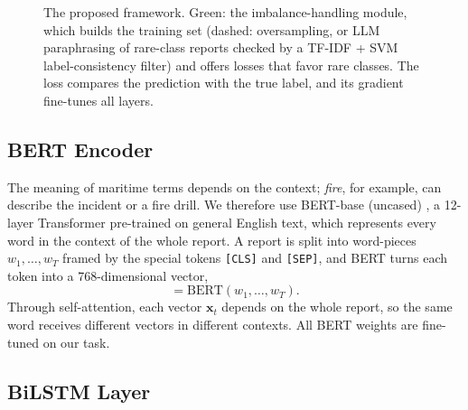 \documentclass[conference]{IEEEtran}
\begin{document}
\begin{figure}[t]
\caption{The proposed framework. Green: the imbalance-handling module, which builds the training set (dashed: oversampling, or LLM paraphrasing of rare-class reports checked by a TF-IDF + SVM label-consistency filter) and offers losses that favor rare classes. The loss compares the prediction with the true label, and its gradient fine-tunes all layers.}
\label{fig:framework}
\end{figure}

\subsection{BERT Encoder}

The meaning of maritime terms depends on the context; \emph{fire}, for example, can describe the incident or a fire drill. We therefore use BERT-base (uncased) \cite{qiu2020pretrained}, a 12-layer Transformer pre-trained on general English text, which represents every word in the context of the whole report. A report is split into word-pieces $w_1, \dots, w_T$ framed by the special tokens \texttt{[CLS]} and \texttt{[SEP]}, and BERT turns each token into a 768-dimensional vector,
\begin{equation}
  [\mathbf{x}_{\mathrm{CLS}}, \mathbf{x}_1, \dots, \mathbf{x}_T] = \mathrm{BERT}(w_1, \dots, w_T).
\end{equation}
Through self-attention, each vector $\mathbf{x}_t$ depends on the whole report, so the same word receives different vectors in different contexts. All BERT weights are fine-tuned on our task.

\subsection{BiLSTM Layer}
\end{document}
